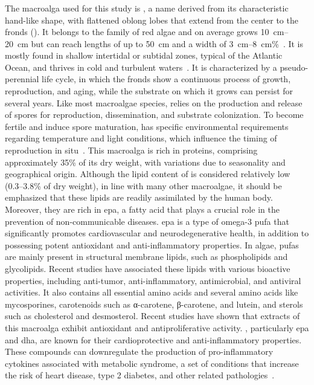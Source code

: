 \subsubsection{}
The macroalga used for this study is , a name derived from its characteristic hand-like shape, with flattened oblong lobes that extend from the center to the fronds (). It belongs to the family of red algae and on average grows \qtyrange{10}{20}{\centi\metre}\zariv{} but can reach lengths of up to \qty{50}{\centi\metre} and a width of \qtyrange{3}{8}{\centi\metre}\%~\parencite{stevant_Concise_2023}. It is mostly found in shallow intertidal or subtidal zones, typical of the Atlantic Ocean, and thrives in cold and turbulent waters~\parencite{mouritsen_human_2013}. It is characterized by a pseudo-perennial life cycle, in which the fronds show a continuous process of growth, reproduction, and aging, while the substrate on which it grows can persist for several years. Like most macroalgae species,  relies on the production and release of spores for reproduction, dissemination, and substrate colonization. To become fertile and induce spore maturation,  has specific environmental requirements regarding temperature and light conditions, which influence the timing of reproduction in situ~\parencite{stevant_Concise_2023}. This macroalga is rich in proteins, comprising approximately 35\% of its dry weight, with variations due to seasonality and geographical origin. Although the lipid content of  is considered relatively low (\numrange{0.3}{3.8}\%\zariv{} of dry weight), in line with many other macroalgae, it should be emphasized that these lipids are readily assimilated by the human body. Moreover, they are rich in \gls{epa}, a fatty acid that plays a crucial role in the prevention of non-communicable diseases. \gls{epa} is a type of omega-3 \gls{pufa} that significantly promotes cardiovascular and neurodegenerative health, in addition to possessing potent antioxidant and anti-inflammatory properties. In algae, \glspl{pufa} are mainly present in structural membrane lipids, such as phospholipids and glycolipids. Recent studies have associated these lipids with various bioactive properties, including anti-tumor, anti-inflammatory, antimicrobial, and antiviral activities. It also contains all essential amino acids and several amino acids like mycosporines, carotenoids such as α-carotene, β-carotene, and lutein, and sterols such as cholesterol and desmosterol. Recent studies have shown that extracts of this macroalga exhibit antioxidant and antiproliferative activity. , particularly \gls{epa} and \gls{dha}, are known for their cardioprotective and anti-inflammatory properties. These compounds can downregulate the production of pro-inflammatory cytokines associated with metabolic syndrome, a set of conditions that increase the risk of heart disease, type 2 diabetes, and other related pathologies~\parencite{lopes_New_2019}.

